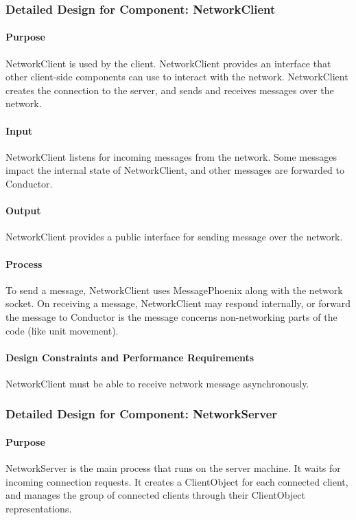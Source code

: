 \documentclass[12pt,a4paper,titlepage]{article}
\begin{document}
\subsubsection{Detailed Design for Component: NetworkClient }
\paragraph{Purpose} NetworkClient is used by the client. NetworkClient provides an interface that other client-side components can use to interact with the network. NetworkClient creates the connection to the server, and sends and receives messages over the network.
\paragraph{Input} NetworkClient listens for incoming messages from the network. Some messages impact the internal state of NetworkClient, and other messages are forwarded to Conductor.
\paragraph{Output} NetworkClient provides a public interface for sending message over the network.
\paragraph{Process} To send a message, NetworkClient uses MessagePhoenix along with the network socket. On receiving a message, NetworkClient may respond internally, or forward the message to Conductor is the message concerns non-networking parts of the code (like unit movement).
\paragraph{Design Constraints and Performance Requirements}
NetworkClient must be able to receive network message asynchronously. 

\subsubsection{Detailed Design for Component: NetworkServer }
\paragraph{Purpose} NetworkServer is the main process that runs on the server machine. It waits for incoming connection requests. It creates a ClientObject for each connected client, and manages the group of connected clients through their ClientObject representations. 
\end{document}
